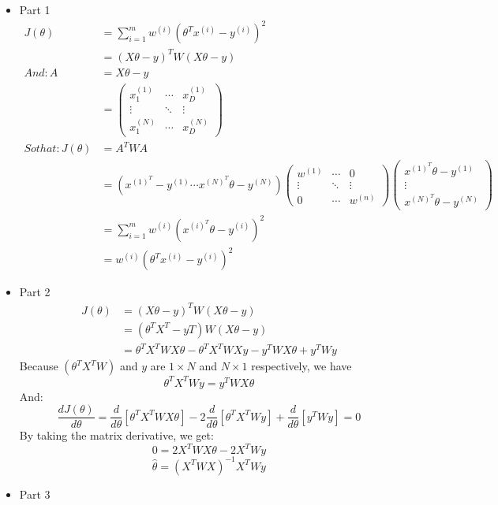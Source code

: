 \documentclass[pdftex,11pt]{article}
\begin{document}
\section{}
\begin{itemize}
\item Part 1 \begin{align*}
	J(\theta)&=\sum^m_{i=1}w^{(i)}(\theta^Tx^{(i)}-y^{(i)})^2\\&=(X\theta-y)^TW(X\theta-y)\\
	And : A&=X\theta-y\\&=
	\begin{pmatrix}
		x_1^{(1)} & \cdots & x_D^{(1)}\\
		\vdots & \ddots & \vdots\\
		x_1^{(N)} & \cdots & x_D^{(N)}
	\end{pmatrix}\\
	So that:
	J(\theta)&=A^TWA\\
	&=(x^{(1)^T}-y^{(1)}\cdots x^{(N)^T}\theta-y^{(N)})
	\begin{pmatrix}
		w^{(1)} & \cdots & 0\\
		\vdots & \ddots & \vdots\\
		0 & \cdots & w^{(n)}
	\end{pmatrix}
	\begin{pmatrix}
		x^{(1)^T}\theta-y^{(1)}\\
		\vdots\\
		x^{(N)^T}\theta-y^{(N)}
	\end{pmatrix}\\
	&=\sum^m_{i=1}w^{(i)}(x^{(i)^T}\theta-y^{(i)})^2\\
	&=w^{(i)}(\theta^Tx^{(i)}-y^{(i)})^2
	\end{align*}
\item Part 2 \begin{align*}
	J(\theta)&=(X\theta-y)^TW(X\theta-y)\\
	&=(\theta^TX^T-yT)W(X\theta-y)\\
	&=\theta^TX^TWX\theta-\theta^TX^TWXy-y^TWX\theta+y^TWy
	\end{align*}
	Because $(\theta^TX^TW)$ and $y$ are $1\times N$ and $N\times 1$ respectively, we have\\
	$$\theta^TX^TWy=y^TWX\theta$$
	And: $$\frac{dJ(\theta)}{d\theta}=\frac{d}{d\theta}[\theta^TX^TWX\theta]-2\frac{d}{d\theta}[\theta^TX^TWy]+\frac{d}{d\theta}[y^TWy]=0$$
	By taking the matrix derivative, we get:
	$$0=2X^TWX\theta-2X^TWy$$
	$$\hat{\theta}=(X^TWX)^{-1}X^TWy$$
\item Part 3


\end{itemize}
\end{document}
